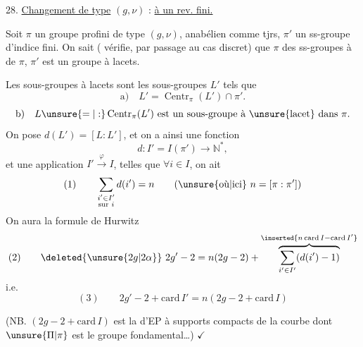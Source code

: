 
28. \uline{Changement de type} $(g,\nu)$  : \uline{ à un rev. fini.}

Soit $\pi$ un groupe profini  de type $(g,\nu)$, anabélien comme tjrs, $\pi'$ un ss-groupe d'indice fini. On sait ( vérifie, par passage au cas discret) que     $\pi$ des ss-groupes à  de $\pi$, $\pi'$ est un groupe à lacets.


Les sous-groupes à lacets sont  les  sous-groupes $L'$ tels que
\[
\text{a)}\quad L'=\operatorname{Centr}_{\pi}(L')\cap\pi'.
\]
\[
\text{b)}\quad L\unsure{=|:}\operatorname{Centr}_{\pi}(L')\text{ est un sous-groupe à \unsure{lacet} dans }\pi.
\]
On pose $d(L')=[L:L']$, et on a ainsi une fonction
\[
d:I'=I(\pi')\longrightarrow\mathbb N^*,
\]
et une application $I'\xrightarrow{\varphi}I$, telles que $\forall i\in I$, on ait
\[
\text{(1)}\qquad \sum_{\substack{i'\in I'\\\text{sur }i}}d(i')=n
\qquad (\text{\unsure{où|ici}}\ n=[\pi:\pi'])
\]
On aura la formule de Hurwitz
\[
\text{(2)}\qquad \deleted{\unsure{2g|2\alpha}}\ 2g'-2=n(2g-2)+\overbrace{\sum_{i'\in I'}(d(i')-1)}^{\inserted{n\operatorname{card}I-\operatorname{card}I'}}
\]
i.e.
\[
(3)\qquad 2g'-2+\mathrm{card}\,I'=n(2g-2+\mathrm{card}\,I)
\]

(NB.  \((2g-2+\mathrm{card}\,I)\) est
 la  d'EP à supports
compacts de la courbe dont \(\unsure{\Pi|\pi}\) est le groupe
fondamental\ldots) \(\checkmark\)

